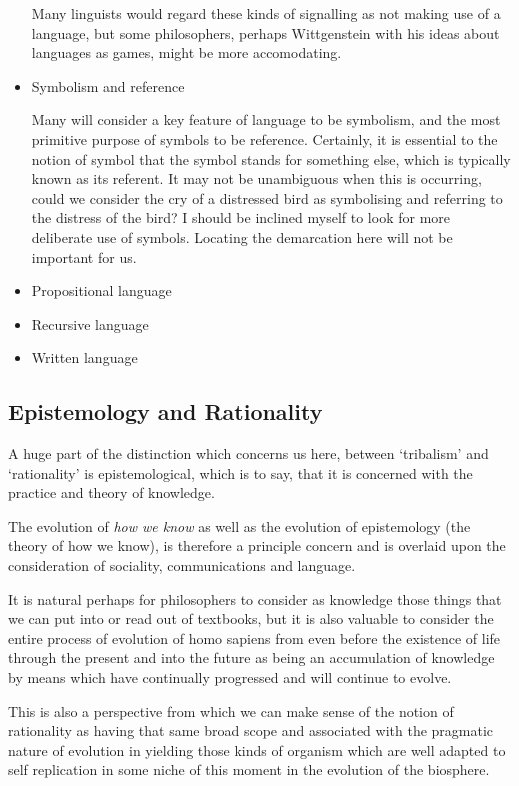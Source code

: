 \documentclass[10pt,titlepage]{book}
\begin{document}
\begin{itemize}
  Many linguists would regard these kinds of signalling as not making use of a language, but some philosophers, perhaps Wittgenstein with his ideas about languages as games, might be more accomodating.
  
\item Symbolism and reference

  Many will consider a key feature of language to be symbolism, and the most primitive purpose of symbols to be reference.
  Certainly, it is essential to the notion of symbol that the symbol stands for something else, which is typically known as its referent.
  It may not be unambiguous when this is occurring, could we consider the cry of a distressed bird as symbolising and referring to the distress of the bird?
  I should be inclined myself to look for more deliberate use of symbols.
  Locating the demarcation here will not be important for us.

\item Propositional language

\item Recursive language

\item Written language
  
 
\end{itemize}

\subsection{Epistemology and Rationality}

A huge part of the distinction which concerns us here, between `tribalism' and `rationality' is epistemological, which is to say, that it is concerned with the practice and theory of knowledge.

The evolution of \emph{how we know} as well as the evolution of epistemology (the theory of how we know), is therefore a principle concern and is overlaid upon the consideration of sociality, communications and language.

It is natural perhaps for philosophers to consider as knowledge those things that we can put into or read out of textbooks, but it is also valuable to consider the entire process of evolution of homo sapiens from even before the existence of life through the present and into the future as being an accumulation of knowledge by means which have continually progressed and will continue to evolve.

This is also a perspective from which we can make sense of the notion of rationality as having that same broad scope and associated with the pragmatic nature of evolution in yielding those kinds of organism which are well adapted to self replication in some niche of this moment in the evolution of the biosphere.
\end{document}
